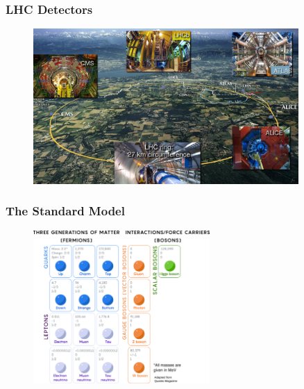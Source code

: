 \documentclass[11pt,xcolor=dvipsnames,aspectratio=169]{beamer}
\begin{document}
\begin{frame}[fragile]
{\begin{minipage}[c]{0.49\linewidth}
    \end{minipage}} 
\end{frame}

\begin{frame}[fragile]
  \frametitle{\bf LHC Detectors}
  \vspace{-5pt}
      \begin{figure}
        \includegraphics[width=0.90\textwidth]{figures/l1/intro/lhc_snip.png}
      \end{figure}
\end{frame}

\begin{frame}[fragile]
  \frametitle{\bf The Standard Model}
  \vspace{-5pt}
      \begin{figure}
        \includegraphics[width=0.60\textwidth]{figures/l1/intro/SM_qm_lm.png}
      \end{figure}
\end{frame}
\end{document}
